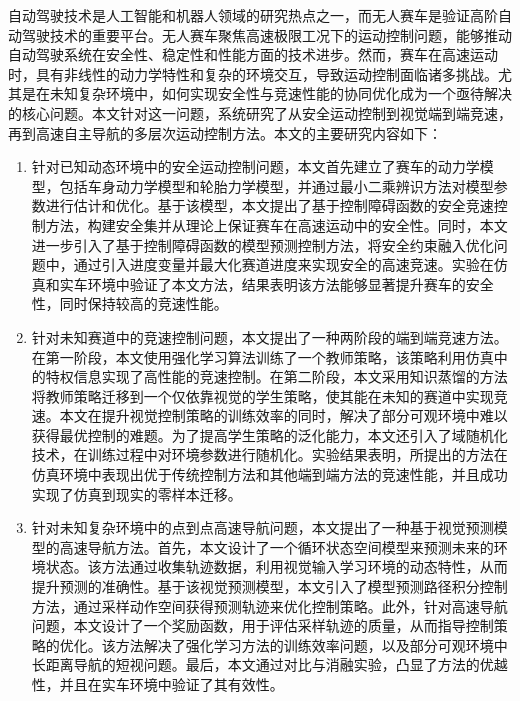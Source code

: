\cleardoublepage
{}

自动驾驶技术是人工智能和机器人领域的研究热点之一，而无人赛车是验证高阶自动驾驶技术的重要平台。无人赛车聚焦高速极限工况下的运动控制问题，能够推动自动驾驶系统在安全性、稳定性和性能方面的技术进步。然而，赛车在高速运动时，具有非线性的动力学特性和复杂的环境交互，导致运动控制面临诸多挑战。尤其是在未知复杂环境中，如何实现安全性与竞速性能的协同优化成为一个亟待解决的核心问题。本文针对这一问题，系统研究了从安全运动控制到视觉端到端竞速，再到高速自主导航的多层次运动控制方法。本文的主要研究内容如下：

\begin{enumerate}
    \item 针对已知动态环境中的安全运动控制问题，本文首先建立了赛车的动力学模型，包括车身动力学模型和轮胎力学模型，并通过最小二乘辨识方法对模型参数进行估计和优化。基于该模型，本文提出了基于控制障碍函数的安全竞速控制方法，构建安全集并从理论上保证赛车在高速运动中的安全性。同时，本文进一步引入了基于控制障碍函数的模型预测控制方法，将安全约束融入优化问题中，通过引入进度变量并最大化赛道进度来实现安全的高速竞速。实验在仿真和实车环境中验证了本文方法，结果表明该方法能够显著提升赛车的安全性，同时保持较高的竞速性能。
    \item 针对未知赛道中的竞速控制问题，本文提出了一种两阶段的端到端竞速方法。在第一阶段，本文使用强化学习算法训练了一个教师策略，该策略利用仿真中的特权信息实现了高性能的竞速控制。在第二阶段，本文采用知识蒸馏的方法将教师策略迁移到一个仅依靠视觉的学生策略，使其能在未知的赛道中实现竞速。本文在提升视觉控制策略的训练效率的同时，解决了部分可观环境中难以获得最优控制的难题。为了提高学生策略的泛化能力，本文还引入了域随机化技术，在训练过程中对环境参数进行随机化。实验结果表明，所提出的方法在仿真环境中表现出优于传统控制方法和其他端到端方法的竞速性能，并且成功实现了仿真到现实的零样本迁移。
    \item 针对未知复杂环境中的点到点高速导航问题，本文提出了一种基于视觉预测模型的高速导航方法。首先，本文设计了一个循环状态空间模型来预测未来的环境状态。该方法通过收集轨迹数据，利用视觉输入学习环境的动态特性，从而提升预测的准确性。基于该视觉预测模型，本文引入了模型预测路径积分控制方法，通过采样动作空间获得预测轨迹来优化控制策略。此外，针对高速导航问题，本文设计了一个奖励函数，用于评估采样轨迹的质量，从而指导控制策略的优化。该方法解决了强化学习方法的训练效率问题，以及部分可观环境中长距离导航的短视问题。最后，本文通过对比与消融实验，凸显了方法的优越性，并且在实车环境中验证了其有效性。

\end{enumerate}

